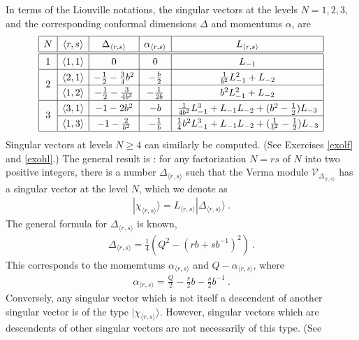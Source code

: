 \documentclass[12pt,a4paper,notitlepage]{report}
\numberwithin{equation}{section}
\theoremstyle{break}
\begin{document}
In terms of the Liouville notations, the singular vectors at the levels $N=1,2,3$, and the corresponding conformal dimensions $\Delta$ and momentums $\alpha$, are 
\begin{align}
\renewcommand{\arraystretch}{1.3}
\begin{array}{|c|c|c|c|c|}
\hline 
N & \langle r,s\rangle & \Delta_{\langle r,s\rangle} & \alpha_{\langle r,s\rangle} & L_{\langle r,s\rangle} 
\\
\hline\hline
1 & \langle 1,1\rangle & 0 & 0 & L_{-1}
\\
\hline
\multirow{2}{*}{2} & 
\langle 2,1\rangle & -\frac12 -\frac{3}{4} b^2 & -\frac{b}{2} & \frac{1}{b^2}L_{-1}^2 + L_{-2}
\\
\cline{2-5}
& \langle 1,2\rangle & -\frac12 - \frac{3}{4b^2} &  -\frac{1}{2b} & b^2L_{-1}^2 + L_{-2} 
\\
\hline
\multirow{2}{*}{3} &
\langle 3,1 \rangle &  -1 -2 b^2 & -b & \frac{1}{4b^2}L_{-1}^3 + L_{-1}L_{-2}+(b^2-\frac12)L_{-3}
\\
\cline{2-5}
& \langle 1,3 \rangle &  -1 - \frac{2}{b^2} &  -\frac{1}{b} & \frac14 b^2L_{-1}^3 + L_{-1}L_{-2} + (\frac{1}{b^2}-\frac12)L_{-3}
\\
\hline
\end{array}
\label{lot}
\end{align}
Singular vectors at levels $N\geq 4$ can similarly be computed. (See Exercises \ref{exolf} and \ref{exohl}.) The general result is \cite{fms97}: for any factorization $N=rs$ of $N$ into two positive integers, there is a number $\Delta_{\langle r,s \rangle}$ such that the Verma module $\mathcal{V}_{\Delta_{\langle r,s \rangle}}$ has a singular vector at the level $N$, which we denote as
\begin{align}
 |\chi_{\langle r,s \rangle}\rangle = L_{\langle r,s \rangle} |\Delta_{\langle r,s \rangle}\rangle\ .
\label{lrs}
\end{align}
The general formula for $\Delta_{\langle r,s \rangle}$ is known, 
\begin{align}
 \Delta_{\langle r,s \rangle} = \frac14\left(Q^2-(rb+sb^{-1})^2\right)\ .
\label{drs}
\end{align}
This corresponds to the momemtums $\alpha_{\langle r,s \rangle}$ and $Q-\alpha_{\langle r,s \rangle}$, where
\begin{align}
 \boxed{\alpha_{\langle r,s \rangle} = \frac{Q}{2} -\frac{r}{2}b - \frac{s}{2}b^{-1} }\ . 
\label{ars}
\end{align}
Conversely, any singular vector which is not itself a descendent of another singular vector is of the type $|\chi_{\langle r,s \rangle}\rangle$. However, singular vectors which are descendents of other singular vectors are not necessarily of this type. (See 
\end{document}

